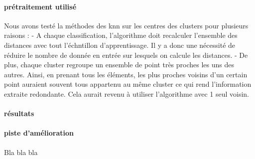 \documentclass[a4paper,10pt]{report}
\begin{document}
\paragraph{prétraitement utilisé}
Nous avons testé la méthodes des knn sur les centres des clusters pour plusieurs raisons :
- A chaque classification, l'algorithme doit recalculer l'ensemble des distances avec tout l'échntillon d'apprentissage. Il y a donc une nécessité de réduire le nombre de donnée en entrée sur lesquels on calcule les distances.
- De plus, chaque cluster regroupe un ensemble de point très proches les uns des autres. Ainsi, en prenant tous les éléments, les plus proches voisins d'un certain point auraient souvent tous appartenu au même cluster ce qui rend l'information extraite redondante. Cela aurait revenu à utiliser l'algorithme avec 1 seul voisin. 
\paragraph{résultats}

\paragraph{piste d'amélioration}

\tableofcontents


Bla bla bla

\listoffigures
\listoftables
\printindex
\end{document}
